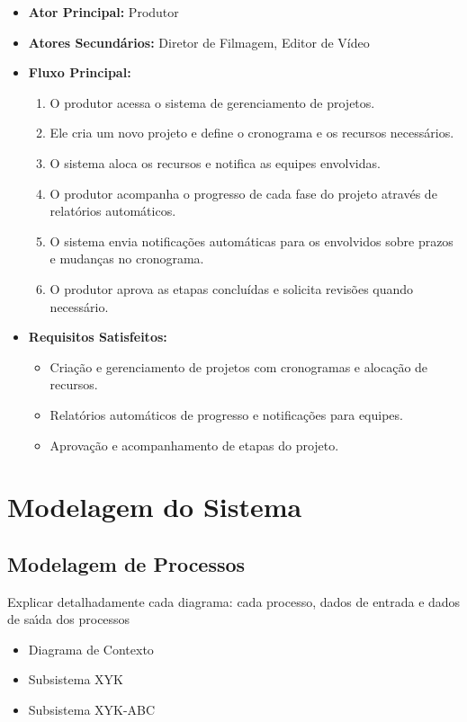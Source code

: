 \begin{itemize}
  \item \textbf{Ator Principal:} Produtor
  \item \textbf{Atores Secundários:} Diretor de Filmagem, Editor de Vídeo
  \item \textbf{Fluxo Principal:}
    \begin{enumerate}
      \item O produtor acessa o sistema de gerenciamento de projetos.
      \item Ele cria um novo projeto e define o cronograma e os recursos necessários.
      \item O sistema aloca os recursos e notifica as equipes envolvidas.
      \item O produtor acompanha o progresso de cada fase do projeto através de relatórios automáticos.
      \item O sistema envia notificações automáticas para os envolvidos sobre prazos e mudanças no cronograma.
      \item O produtor aprova as etapas concluídas e solicita revisões quando necessário.
    \end{enumerate}
  \item \textbf{Requisitos Satisfeitos:}
    \begin{itemize}
      \item Criação e gerenciamento de projetos com cronogramas e alocação de recursos.
      \item Relatórios automáticos de progresso e notificações para equipes.
      \item Aprovação e acompanhamento de etapas do projeto.
    \end{itemize}
\end{itemize}


\section{Modelagem do Sistema}


\subsection{Modelagem de Processos}

Explicar detalhadamente cada diagrama: cada processo, dados de entrada e dados de sa\'{\i}da dos processos

\begin{itemize}
  \item Diagrama de Contexto

  \item Subsistema XYK

  \item Subsistema XYK-ABC

\end{itemize}



